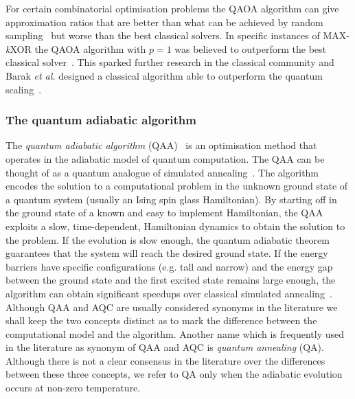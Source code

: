 \documentclass[a4paper, 11pt]{article}
\begin{document}
For certain combinatorial optimisation problems the QAOA algorithm can give approximation ratios that are better than what can be achieved by random sampling~\cite{farhi2014quantum} but worse than the best classical solvers. In specific instances of MAX-\textit{k}XOR the QAOA algorithm with $p = 1$ was believed to outperform the best classical solver~\cite{farhi2014applied}. This sparked further research in the classical community and Barak \textit{et al.} designed a classical algorithm able to outperform the quantum scaling~\cite{barak2015beating}.

\subsubsection*{The quantum adiabatic algorithm}

The \textit{quantum adiabatic algorithm} (QAA)~\cite{farhi2000quantum} is an optimisation method that operates in the adiabatic model of quantum computation. The QAA can be thought of as a quantum analogue of simulated annealing~\cite{kirkpatrick1984optimization}. The algorithm encodes the solution to a computational problem in the unknown ground state of a quantum system (usually an Ising spin glass Hamiltonian). By starting off in the ground state of a known and easy to implement Hamiltonian, the QAA exploits a slow, time-dependent, Hamiltonian dynamics to obtain the solution to the problem. If the evolution is slow enough, the quantum adiabatic theorem~\cite{messiah1958quantum} guarantees that the system will reach the desired ground state. If the energy barriers have specific configurations (e.g. tall and narrow) and the energy gap between the ground state and the first excited state remains large enough, the algorithm can obtain significant speedups over classical simulated annealing~\cite{reichardt2004quantum, crosson2016simulated}. \\

Although QAA and AQC are usually considered synonyms in the literature we shall keep the two concepts distinct as to mark the difference between the computational model and the algorithm. Another name which is frequently used in the literature as synonym of QAA and AQC is \textit{quantum annealing} (QA). Although there is not a clear consensus in the literature over the differences between these three concepts, we refer to QA only when the adiabatic evolution occurs at non-zero temperature.\\
\end{document}
